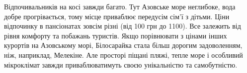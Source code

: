 Відпочивальників на косі завжди багато. Тут Азовське море неглибоке, вода добре
прогрівається, тому місце приваблює передусім сім'ї з дітьми. Ціни відпочинку в
пансіонатах зовсім різні (від 100 грн до 1100). Все залежить від рівня комфорту
та побажань туристів. Якщо порівнювати з цінами інших курортів на Азовському
морі, Білосарайка стала більш дорогим задоволенням, ніж, наприклад, Мелекіне.
Але просторі піщані пляжі, тепле море і особливий мікроклімат завжди
приваблюватимуть своєю унікальністю та самобутністю.
